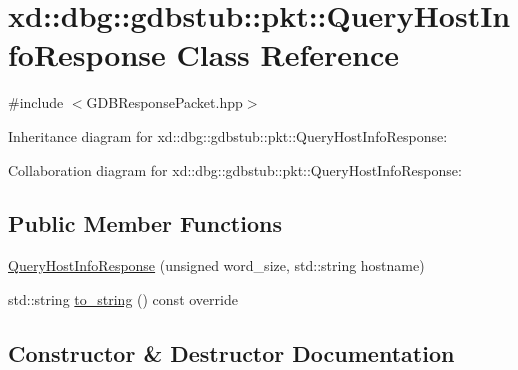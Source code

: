 \hypertarget{classxd_1_1dbg_1_1gdbstub_1_1pkt_1_1_query_host_info_response}{}\section{xd\+:\+:dbg\+:\+:gdbstub\+:\+:pkt\+:\+:Query\+Host\+Info\+Response Class Reference}
\label{classxd_1_1dbg_1_1gdbstub_1_1pkt_1_1_query_host_info_response}


{\ttfamily \#include $<$G\+D\+B\+Response\+Packet.\+hpp$>$}



Inheritance diagram for xd\+:\+:dbg\+:\+:gdbstub\+:\+:pkt\+:\+:Query\+Host\+Info\+Response\+:


Collaboration diagram for xd\+:\+:dbg\+:\+:gdbstub\+:\+:pkt\+:\+:Query\+Host\+Info\+Response\+:
\subsection*{Public Member Functions}
\begin{DoxyCompactItemize}
\item 
\mbox{\hyperlink{classxd_1_1dbg_1_1gdbstub_1_1pkt_1_1_query_host_info_response_a49e578ded24d29aebc85a075b7faa29d}{Query\+Host\+Info\+Response}} (unsigned word\+\_\+size, std\+::string hostname)
\item 
std\+::string \mbox{\hyperlink{classxd_1_1dbg_1_1gdbstub_1_1pkt_1_1_query_host_info_response_abbb6673484d04cacc50302aed62f4ed5}{to\+\_\+string}} () const override
\end{DoxyCompactItemize}


\subsection{Constructor \& Destructor Documentation}
\mbox{\label{classxd_1_1dbg_1_1gdbstub_1_1pkt_1_1_query_host_info_response_a49e578ded24d29aebc85a075b7faa29d}} 
